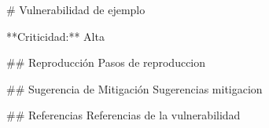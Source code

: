 
                # Vulnerabilidad de ejemplo

                **Criticidad:** Alta

                ## Reproducción
                Pasos de reproduccion

                ## Sugerencia de Mitigación
                Sugerencias mitigacion

                ## Referencias
                Referencias de la vulnerabilidad
                